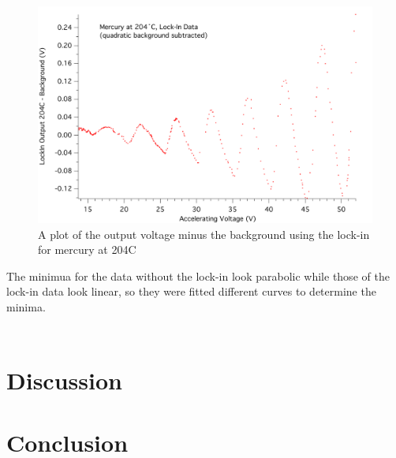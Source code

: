 \documentclass[prb,preprint]{revtex4-1}
\begin{document}
\begin{figure}[h!]
\centering
\includegraphics[width=6in]{204C_lockin_noback.pdf}
\caption{A plot of the output voltage minus the background using the lock-in for mercury at 204\degree C}
\label{nobacklock}
\end{figure}

The minimua for the data without the lock-in look parabolic while those of the lock-in data look linear, so they were fitted different curves to determine the minima. 


\begin{table}[h!]
\centering
\caption{ }
\begin{ruledtabular}
\begin{tabular}{lc}
     
\end{tabular}
\end{ruledtabular}
\label{parameters}
\end{table}


\section{Discussion}


\section{Conclusion}

\begin{thebibliography}{3}

\end{thebibliography}
\end{document}
